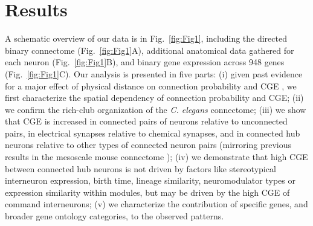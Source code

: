 \documentclass[10pt,letterpaper]{article}
\begin{document}
\section*{Results}
A schematic overview of our data is in Fig.~\ref{fig:Fig1}, including
the directed binary connectome (Fig.~\ref{fig:Fig1}A),
additional anatomical data gathered for each neuron (Fig.~\ref{fig:Fig1}B),
and binary gene expression across 948 genes (Fig.~\ref{fig:Fig1}C).
Our analysis is presented in five parts:
(i) given past evidence for a major effect of physical distance on connection probability and CGE \cite{Fulcher:2016ck}, we first characterize the spatial dependency of connection probability and CGE;
(ii) we confirm the rich-club organization of the \emph{C. elegans} connectome;
(iii) we show that CGE is increased in connected pairs of neurons relative to unconnected pairs, in electrical synapses relative to chemical synapses, and in connected hub neurons relative to other types of connected neuron pairs (mirroring previous results in the mesoscale mouse connectome \cite{Fulcher:2016ck});
(iv) we demonstrate that high CGE between connected hub neurons is not driven by factors like stereotypical interneuron expression, birth time, lineage similarity, neuromodulator types or expression similarity within modules, but may be driven by the high CGE of command interneurons;
(v) we characterize the contribution of specific genes, and broader gene ontology categories, to the observed patterns.
\end{document}

